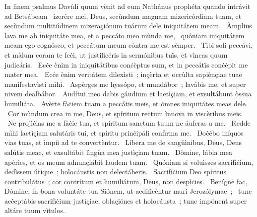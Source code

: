 { In finem psalmus Davídi  quum vënit ad eum Nathánus prophéta quando intrávit ad Betsábeam }
{%
~izerére mei, Deus, secùndum magnam mizericórdiam tuam, et secùndum multitúdinem mizeraçiónum tuárum dele iniquitátem meam. 
~Àmplius lava me ab iniquitáte mea, et a peccáto meo mùnda me, 
~quóniam iniquitátem meam ego cognósco, et peccátum meum còntra me est sèmper. 
~Tìbi soli peccávi, et màlum coram te feċi, ut justificéris in sermónibus tuïs, et vincas quum judicáris. 
~Ecċe ènim in iniquitátibus conċèptus sum, et in peccátïs conċépit me mater mea. 
~Ecċe ènim veritátem dilexìsti~; inçèrta et occùlta sapiènçiae tuae manifestavìsti mìhi. 
~Aspèrges me hyssópo, et mundábor~; lavábis me, et super nivem dealbábor. 
~Audítui meo dabis gáudium et laetìçiam, et exsultábunt òssua humiliáta. 
~Avèrte fàċiem tuam a peccátïs meïs, et òmnes iniquitátes meas dele. 
~Cor mùndum crea in me, Deus, et spíritum rectum ìnnova in viscèribus meïs. 
~Ne projìċias me a fàċie tua, et spíritum sanctum tuum ne áuferas a me. 
~Redde mìhi laetìçiam salutáris tui, et spíritu prinċipáli confìrma me. 
~Doċébo iníquos vias tuas, et ìmpii ad te convertèntur. 
~Líbera me de sangüìnibus, Deus, Deus salútis meae, et exsultábit lìngüa mea justìçiam tuam. 
~Dòmine, lábia mea apèries, et os meum adnunçiábit laudem tuam. 
~Quóniam si voluìsses sacrifìċium, dedìssem útique~; holocáustis non delectáberis. 
~Sacrifìċium Deo spíritus contribulátus~; cor contrítum et humiliátum, Deus, non despìċies. 
~Benígne fac, Dòmine, in bona voluntáte tua Siónem, ut aedificèntur muri Jerozólymae~; 
~tunc acċeptábis sacrifìċium justìçiae, oblaçiónes et holocáusta~; tunc impónent super altáre tuum vìtulos. 
}
